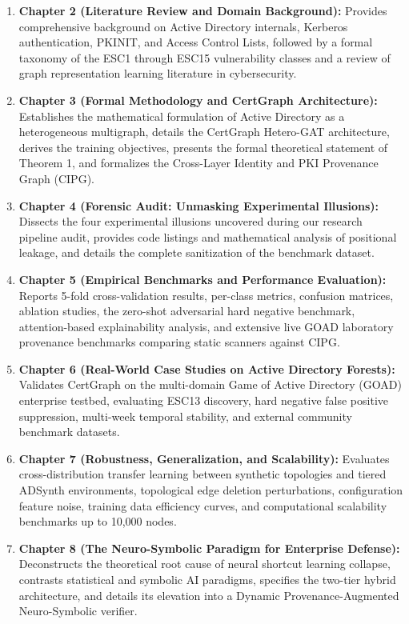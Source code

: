 \begin{enumerate}
    \item \textbf{Chapter 2 (Literature Review and Domain Background):} Provides comprehensive background on Active Directory internals, Kerberos authentication, PKINIT, and Access Control Lists, followed by a formal taxonomy of the ESC1 through ESC15 vulnerability classes and a review of graph representation learning literature in cybersecurity.
    \item \textbf{Chapter 3 (Formal Methodology and CertGraph Architecture):} Establishes the mathematical formulation of Active Directory as a heterogeneous multigraph, details the CertGraph Hetero-GAT architecture, derives the training objectives, presents the formal theoretical statement of Theorem 1, and formalizes the Cross-Layer Identity and PKI Provenance Graph (CIPG).
    \item \textbf{Chapter 4 (Forensic Audit: Unmasking Experimental Illusions):} Dissects the four experimental illusions uncovered during our research pipeline audit, provides code listings and mathematical analysis of positional leakage, and details the complete sanitization of the benchmark dataset.
    \item \textbf{Chapter 5 (Empirical Benchmarks and Performance Evaluation):} Reports 5-fold cross-validation results, per-class metrics, confusion matrices, ablation studies, the zero-shot adversarial hard negative benchmark, attention-based explainability analysis, and extensive live GOAD laboratory provenance benchmarks comparing static scanners against CIPG.
    \item \textbf{Chapter 6 (Real-World Case Studies on Active Directory Forests):} Validates CertGraph on the multi-domain Game of Active Directory (GOAD) enterprise testbed, evaluating ESC13 discovery, hard negative false positive suppression, multi-week temporal stability, and external community benchmark datasets.
    \item \textbf{Chapter 7 (Robustness, Generalization, and Scalability):} Evaluates cross-distribution transfer learning between synthetic topologies and tiered ADSynth environments, topological edge deletion perturbations, configuration feature noise, training data efficiency curves, and computational scalability benchmarks up to 10,000 nodes.
    \item \textbf{Chapter 8 (The Neuro-Symbolic Paradigm for Enterprise Defense):} Deconstructs the theoretical root cause of neural shortcut learning collapse, contrasts statistical and symbolic AI paradigms, specifies the two-tier hybrid architecture, and details its elevation into a Dynamic Provenance-Augmented Neuro-Symbolic verifier.

\end{enumerate}
